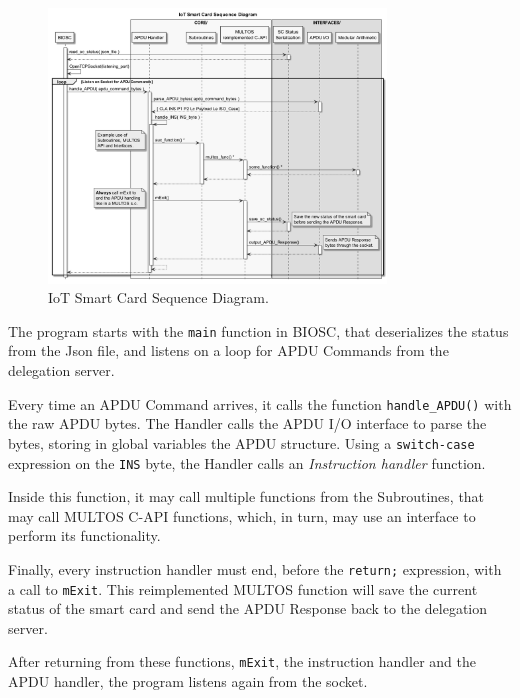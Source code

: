 \begin{figure}[bth]
	\begin{center}
		\includegraphics[width=0.8\textwidth]{gfx/UML/sequenceBIOSC}
	\end{center}
	\caption{IoT Smart Card Sequence Diagram.}
	\label{fig:sequenceBIOSC}
\end{figure}



The program starts with the \texttt{main} function in BIOSC, that deserializes the status from the Json file, and listens on a loop for APDU Commands from the delegation server.

Every time an APDU Command arrives, it calls the function \texttt{handle\_APDU()} with the raw APDU bytes. The Handler calls the APDU I/O interface to parse the bytes, storing in global variables the APDU structure. Using a \texttt{switch-case} expression on the \texttt{INS} byte, the Handler calls an \textit{Instruction handler} function.

Inside this function, it may call multiple functions from the Subroutines, that may call MULTOS C-API functions, which, in turn, may use an interface to perform its functionality.

Finally, every instruction handler must end, before the \texttt{return;} expression, with a call to \texttt{mExit}. This reimplemented MULTOS function will save the current status of the smart card and send the APDU Response back to the delegation server.

After returning from these functions, \texttt{mExit}, the instruction handler and the APDU handler, the program listens again from the socket.



